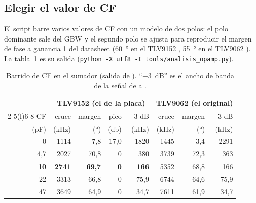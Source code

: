 \subsection{Elegir el valor de CF}

El script barre varios valores de CF con un modelo de dos polos: el polo dominante sale del GBW y el segundo polo se
ajusta para reproducir el margen de fase a ganancia 1 del datasheet (\SI{60}{\degree} en el TLV9152 , \SI{55}{\degree} en el TLV9062 ). La tabla~\ref{tab:c03-cf} es su salida
(\texttt{python -X utf8 -I tools/analisis\_opamp.py}).

\begin{table}[htbp]
\centering\small
\caption{Barrido de CF en el sumador (salida de ). ``$-3$~dB'' es el ancho de banda
de la señal de  a .}
\label{tab:c03-cf}
\begin{tabular}{@{}r rrrr rrr@{}}
\toprule
 & \multicolumn{4}{c}{TLV9152 (el de la placa)} & \multicolumn{3}{c}{TLV9062 (el original)}\\
\cmidrule(lr){2-5}\cmidrule(l){6-8}
CF & cruce & margen & pico & $-3$ dB & cruce & margen & $-3$ dB\\
(\si{\pico\farad}) & (\si{\kilo\hertz}) & (\si{\degree}) & (\si{\decibel}) & (\si{\kilo\hertz}) & (\si{\kilo\hertz}) & (\si{\degree}) & (\si{\kilo\hertz})\\
\midrule
0    & 1114 & 7,8  & 17,0 & 1820 & 1445 & 3,4  & 2291\\
4,7  & 2027 & 70,8 & 0    & 380  & 3739 & 72,3 & 363\\
\textbf{10}   & \textbf{2741} & \textbf{69,7} & \textbf{0} & \textbf{166} & 5352 & 68,8 & 166\\
22   & 3313 & 66,8 & 0    & 75,9 & 6744 & 64,6 & 75,9\\
47   & 3649 & 64,9 & 0    & 34,7 & 7611 & 61,9 & 34,7\\
\bottomrule
\end{tabular}
\end{table}

